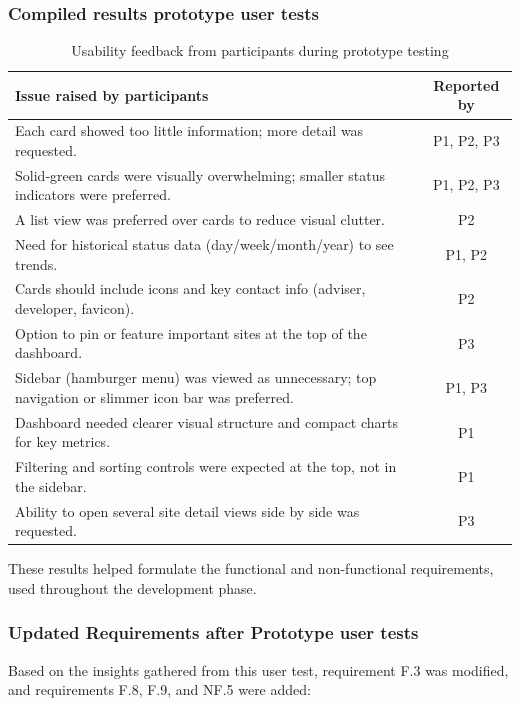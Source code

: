 \subsubsection{Compiled results prototype user tests}
\label{subsubsec:compiled_res_proto_user_test}

\begin{table}[H]
\centering
\begin{tabular}{|p{8.2cm}|c|}
\hline
\textbf{Issue raised by participants} & \textbf{Reported by} \\ \hline
Each card showed too little information; more detail was requested.& P1, P2, P3 \\ \hline
Solid‑green cards were visually overwhelming; smaller status indicators were preferred. & P1, P2, P3 \\ \hline
A list view was preferred over cards to reduce visual clutter. & P2 \\ \hline
Need for historical status data (day/week/month/year) to see trends. & P1, P2 \\ \hline
Cards should include icons and key contact info (adviser, developer, favicon). & P2 \\ \hline
Option to pin or feature important sites at the top of the dashboard. & P3 \\ \hline
Sidebar (hamburger menu) was viewed as unnecessary; top navigation or slimmer icon bar was preferred. & P1, P3 \\ \hline
Dashboard needed clearer visual structure and compact charts for key metrics. & P1 \\ \hline
Filtering and sorting controls were expected at the top, not in the sidebar. & P1 \\ \hline
Ability to open several site detail views side by side was requested. & P3 \\ \hline
\end{tabular}
\caption{Usability feedback from participants during prototype testing}
\label{tab:prototype-issues}
\end{table}
These results helped formulate the functional and non-functional requirements, used throughout the development phase.

\subsubsection{Updated Requirements after Prototype user tests}
Based on the insights gathered from this user test,  requirement F.3 was modified, and requirements F.8, F.9, and NF.5 were added:


